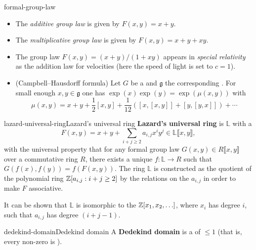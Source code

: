 \begin{example}{formal-group-law}
    \begin{itemize}
        \item The \textit{additive group law} is given by $F(x, y) = x + y$.
        \item The \textit{multiplicative group law} is given by $F(x, y) = x + y + xy$.
        \item The group law $F(x, y) = (x + y) / (1 + xy)$ appears in \textit{special relativity} as the addition law for velocities (here the speed of light is set to $c = 1$).
        \item (Campbell--Hausdorff formula) Let $G$ be a  and $\mathfrak{g}$ the corresponding . For small enough $x, y \in \mathfrak{g}$ one has $\exp(x) \exp(y) = \exp(\mu(x, y))$ with
        \[ \mu(x, y) = x + y + \frac{1}{2} [x, y] + \frac{1}{12}([x, [x, y]] + [y, [y, x]]) + \cdots \]
    \end{itemize}
\end{example}

\begin{topic}{lazard-universal-ring}{Lazard's universal ring}
    \textbf{Lazard's universal ring} is  $\mathbb{L}$ with a 
    \[ F(x, y) = x + y + \sum_{i + j \ge 2} a_{i,j} x^i y^j \in \mathbb{L}\llbracket x, y \rrbracket , \]
    with the universal property that for any formal group law $G(x, y) \in R \llbracket x, y \rrbracket$ over a commutative ring $R$, there exists a unique  $f : \mathbb{L} \to R$ such that $G(f(x), f(y)) = f(F(x, y))$. The ring $\mathbb{L}$ is constructed as the quotient of the polynomial ring $\mathbb{Z}[a_{i, j} : i + j \ge 2]$ by the relations on the $a_{i, j}$ in order to make $F$ associative.
    
    It can be shown that $\mathbb{L}$ is isomorphic to the  $\mathbb{Z}[x_1, x_2, \ldots]$, where $x_i$ has degree $i$, such that $a_{i, j}$ has degree $(i + j - 1)$.
\end{topic}

\begin{topic}{dedekind-domain}{Dedekind domain}
    A \textbf{Dedekind domain} is a   of  $\le 1$ (that is, every non-zero  is ).
\end{topic}

